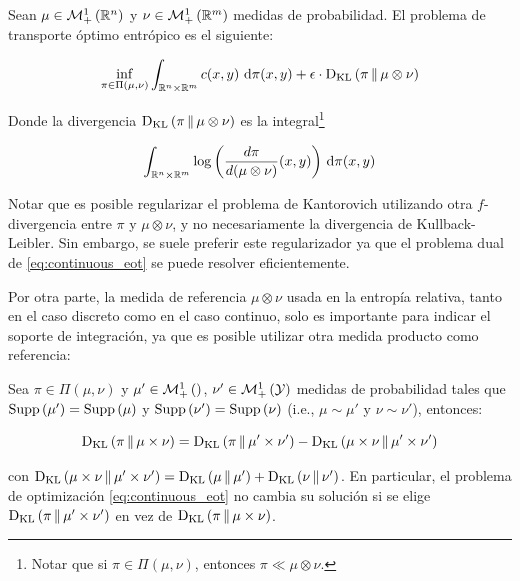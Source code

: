\begin{defn}
	Sean $\mu\in\mathcal{M}_+^1\left(\mathbb{R}^n\right)$ y $\nu\in\mathcal{M}_+^1\left(\mathbb{R}^m\right)$ medidas de probabilidad. El problema de transporte óptimo entrópico es el siguiente:

	\begin{equation}
		\label{eq:continuous_eot}
		\inf_{\pi\in\Pi(\mu,\nu)}  \int_{\mathbb{R}^n\times\mathbb{R}^m} c(x,y) \,\operatorname{d}\!\pi(x,y) + \epsilon\cdot \operatorname{D_{KL}}\left(\pi\,\|\,\mu\otimes\nu\right)
	\end{equation}

	Donde la divergencia $\operatorname{D_{KL}}\left(\pi\,\|\,\mu\otimes\nu\right)$ es la integral\footnote{Notar que si $\pi\in\Pi(\mu,\nu)$, entonces $\pi\ll\mu\otimes\nu$. }

	\begin{equation}
		\int_{\mathbb{R}^n\times\mathbb{R}^m} \log\left(\frac{d\pi}{d(\mu\otimes\nu)}(x,y)\right) \,\operatorname{d}\! \pi(x,y)
	\end{equation}
\end{defn}

Notar que es posible regularizar el problema de Kantorovich utilizando otra $f$-divergencia entre $\pi$ y $\mu\otimes\nu$, y no necesariamente la divergencia de Kullback-Leibler. Sin embargo, se suele preferir este regularizador ya que el problema dual de \eqref{eq:continuous_eot} se puede resolver eficientemente.

Por otra parte, la medida de referencia $\mu\otimes\nu$ usada en la entropía relativa, tanto en el caso discreto como en el caso continuo, solo es importante para indicar el soporte de integración, ya que es posible utilizar otra medida producto como referencia:

\begin{prop}
	Sea $\pi\in\Pi(\mu,\nu)$ y $\mu'\in\mathcal{M}_+^1\left(\right)$, $\nu'\in\mathcal{M}_+^1\left(\mathcal{Y}\right)$ medidas de probabilidad tales que $\operatorname{Supp}\left(\mu'\right) = \operatorname{Supp}\left(\mu\right)$ y $\operatorname{Supp}\left(\nu'\right) = \operatorname{Supp}\left(\nu\right)$ (i.e., $\mu\sim\mu'$ y $\nu\sim\nu'$), entonces:

	\begin{equation}
		\operatorname{D_{KL}}\left(\pi\,\|\,\mu\times\nu\right) = \operatorname{D_{KL}}\left(\pi\,\|\,\mu'\times\nu'\right) - \operatorname{D_{KL}}\left(\mu\times\nu\,\|\,\mu'\times\nu'\right)
	\end{equation}

	con $\operatorname{D_{KL}}\left(\mu\times\nu\,\|\,\mu'\times\nu'\right) = \operatorname{D_{KL}}\left(\mu\,\|\,\mu'\right) + \operatorname{D_{KL}}\left(\nu\,\|\,\nu'\right)$. En particular, el problema de optimización \eqref{eq:continuous_eot} no cambia su solución si se elige $\operatorname{D_{KL}}\left(\pi\,\|\,\mu'\times\nu'\right)$ en vez de $\operatorname{D_{KL}}\left(\pi\,\|\,\mu\times\nu\right)$.
\end{prop}

